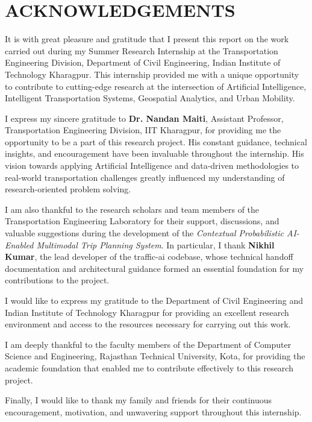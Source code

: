 \documentclass[12pt, a4paper]{report}
\begin{document}

\clearpage

\section*{ACKNOWLEDGEMENTS}

It is with great pleasure and gratitude that I present this report on the work carried out during my Summer Research Internship at the Transportation Engineering Division, Department of Civil Engineering, Indian Institute of Technology Kharagpur. This internship provided me with a unique opportunity to contribute to cutting-edge research at the intersection of Artificial Intelligence, Intelligent Transportation Systems, Geospatial Analytics, and Urban Mobility.

I express my sincere gratitude to \textbf{Dr. Nandan Maiti}, Assistant Professor, Transportation Engineering Division, IIT Kharagpur, for providing me the opportunity to be a part of this research project. His constant guidance, technical insights, and encouragement have been invaluable throughout the internship. His vision towards applying Artificial Intelligence and data-driven methodologies to real-world transportation challenges greatly influenced my understanding of research-oriented problem solving.

I am also thankful to the research scholars and team members of the Transportation Engineering Laboratory for their support, discussions, and valuable suggestions during the development of the \textit{Contextual Probabilistic AI-Enabled Multimodal Trip Planning System}. In particular, I thank \textbf{Nikhil Kumar}, the lead developer of the traffic-ai codebase, whose technical handoff documentation and architectural guidance formed an essential foundation for my contributions to the project.

I would like to express my gratitude to the Department of Civil Engineering and Indian Institute of Technology Kharagpur for providing an excellent research environment and access to the resources necessary for carrying out this work.

I am deeply thankful to the faculty members of the Department of Computer Science and Engineering, Rajasthan Technical University, Kota, for providing the academic foundation that enabled me to contribute effectively to this research project.

Finally, I would like to thank my family and friends for their continuous encouragement, motivation, and unwavering support throughout this internship.
\end{document}
